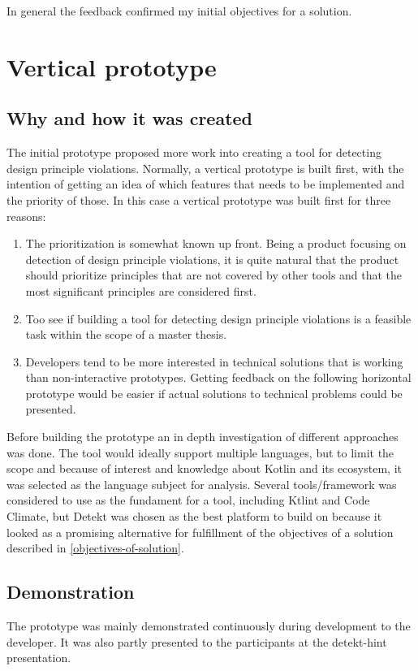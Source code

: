 \documentclass{report}
\begin{document}
In general the feedback confirmed my initial objectives for a solution.

\section{Vertical prototype}

\subsection*{Why and how it was created}
The initial prototype proposed more work into creating a tool for detecting design principle violations. Normally, a vertical prototype is built first, with the intention of getting an idea of which features that needs to be implemented and the priority of those. In this case a vertical prototype was built first for three reasons:

\begin{enumerate}
    \item The prioritization is somewhat known up front. Being a product focusing on detection of design principle violations, it is quite natural that the product should prioritize principles that are not covered by other tools and that the most significant principles are considered first.
    \item Too see if building a tool for detecting design principle violations is a feasible task within the scope of a master thesis.
    \item Developers tend to be more interested in technical solutions that is working than non-interactive prototypes. Getting feedback on the following horizontal prototype would be easier if actual solutions to technical problems could be presented.
\end{enumerate}

Before building the prototype an in depth investigation of different approaches was done. The tool would ideally support multiple languages, but to limit the scope and because of interest and knowledge about Kotlin and its ecosystem, it was selected as the language subject for analysis. Several tools/framework was considered to use as the fundament for a tool, including Ktlint and Code Climate, but Detekt was chosen as the best platform to build on because it looked as a promising alternative for fulfillment of the objectives of a solution described in \ref{objectives-of-solution}.

\subsection*{Demonstration}
The prototype was mainly demonstrated continuously during development to the developer. It was also partly presented to the participants at the detekt-hint presentation.
\end{document}
